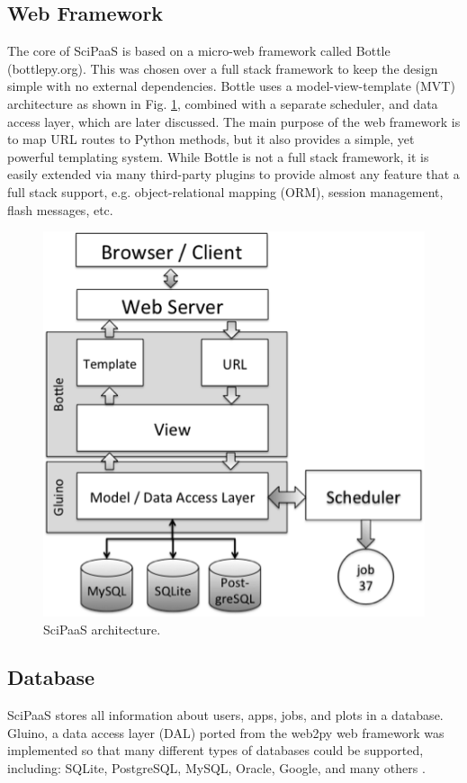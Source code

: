 \documentclass[10pt,reprint]{socc14}
\begin{document}
\subsection{Web Framework}

The core of SciPaaS is based on a micro-web framework called Bottle (bottlepy.org).  This was chosen over a full stack framework to keep the design simple with no external dependencies.  Bottle uses a model-view-template (MVT) architecture as shown in Fig. \ref{arch}, combined with a separate scheduler, and data access layer, which are later discussed.  The main purpose of the web framework is to map URL routes to Python methods, but it also provides a simple, yet powerful templating system.  While Bottle is not a full stack framework, it is easily extended via many third-party plugins to provide almost any feature that a full stack support, e.g. object-relational mapping (ORM), session management, flash messages, etc.

\begin{figure}[t]
\centering
\includegraphics[natwidth=450,natheight=454]{figs/arch.png}
\caption{SciPaaS architecture. \label{arch}}
\end{figure}

\subsection{Database}

SciPaaS stores all information about users, apps, jobs, and plots in a database. Gluino, a data access layer (DAL) ported from the web2py web framework was implemented so that many different types of databases could be supported, including: SQLite, PostgreSQL, MySQL, Oracle, Google, and many others \cite{web2py}.
\end{document}
